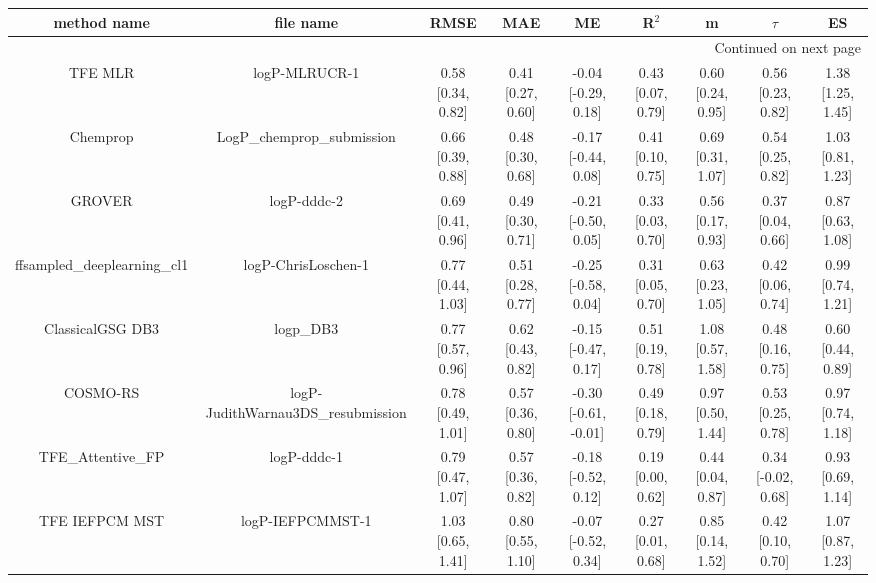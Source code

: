 \documentclass{article}
\begin{document}
\begin{center}
\scriptsize
\begin{longtable}{|ccccccccc|}
\toprule
                method name &                                   file name &               RMSE &                MAE &                    ME &              R$^2$ &                     m &                $\tau$ &                    ES \\
\midrule
\endhead
\midrule
\multicolumn{9}{r}{{Continued on next page}} \\
\midrule
\endfoot

\bottomrule
\endlastfoot
                    TFE MLR &                               logP-MLRUCR-1 &  0.58 [0.34, 0.82] &  0.41 [0.27, 0.60] &   -0.04 [-0.29, 0.18] &  0.43 [0.07, 0.79] &     0.60 [0.24, 0.95] &     0.56 [0.23, 0.82] &     1.38 [1.25, 1.45] \\
                   Chemprop &                  LogP\_chemprop\_submission &  0.66 [0.39, 0.88] &  0.48 [0.30, 0.68] &   -0.17 [-0.44, 0.08] &  0.41 [0.10, 0.75] &     0.69 [0.31, 1.07] &     0.54 [0.25, 0.82] &     1.03 [0.81, 1.23] \\
                     GROVER &                                 logP-dddc-2 &  0.69 [0.41, 0.96] &  0.49 [0.30, 0.71] &   -0.21 [-0.50, 0.05] &  0.33 [0.03, 0.70] &     0.56 [0.17, 0.93] &     0.37 [0.04, 0.66] &     0.87 [0.63, 1.08] \\
 ffsampled_deeplearning_cl1 &                         logP-ChrisLoschen-1 &  0.77 [0.44, 1.03] &  0.51 [0.28, 0.77] &   -0.25 [-0.58, 0.04] &  0.31 [0.05, 0.70] &     0.63 [0.23, 1.05] &     0.42 [0.06, 0.74] &     0.99 [0.74, 1.21] \\
           ClassicalGSG DB3 &                                   logp\_DB3 &  0.77 [0.57, 0.96] &  0.62 [0.43, 0.82] &   -0.15 [-0.47, 0.17] &  0.51 [0.19, 0.78] &     1.08 [0.57, 1.58] &     0.48 [0.16, 0.75] &     0.60 [0.44, 0.89] \\
                   COSMO-RS &          logP-JudithWarnau3DS\_resubmission &  0.78 [0.49, 1.01] &  0.57 [0.36, 0.80] &  -0.30 [-0.61, -0.01] &  0.49 [0.18, 0.79] &     0.97 [0.50, 1.44] &     0.53 [0.25, 0.78] &     0.97 [0.74, 1.18] \\
           TFE_Attentive_FP &                                 logP-dddc-1 &  0.79 [0.47, 1.07] &  0.57 [0.36, 0.82] &   -0.18 [-0.52, 0.12] &  0.19 [0.00, 0.62] &     0.44 [0.04, 0.87] &    0.34 [-0.02, 0.68] &     0.93 [0.69, 1.14] \\
             TFE IEFPCM MST &                            logP-IEFPCMMST-1 &  1.03 [0.65, 1.41] &  0.80 [0.55, 1.10] &   -0.07 [-0.52, 0.34] &  0.27 [0.01, 0.68] &     0.85 [0.14, 1.52] &     0.42 [0.10, 0.70] &     1.07 [0.87, 1.23] \\

\end{longtable}
\end{center}
\end{document}
